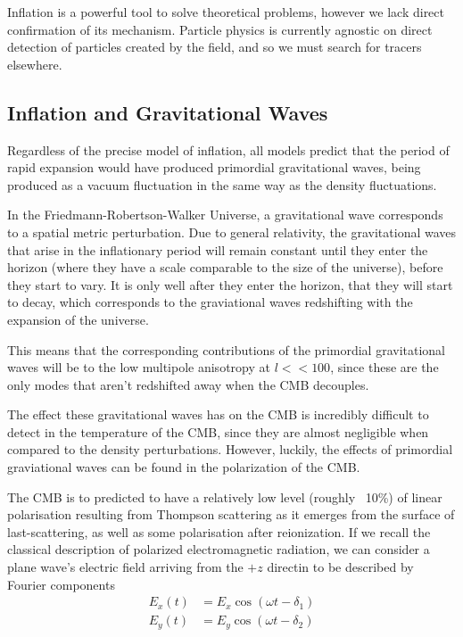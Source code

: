Inflation is a powerful tool to solve theoretical problems, however we lack direct confirmation of its mechanism. Particle physics is currently agnostic on direct detection of particles created by the field, and so we must search for tracers elsewhere. 

\subsection{Inflation and Gravitational Waves}
Regardless of the precise model of inflation, all models predict that the period of rapid expansion would have produced primordial gravitational waves, being produced as a vacuum fluctuation in the same way as the density fluctuations. 

\par In the Friedmann-Robertson-Walker Universe, a gravitational wave corresponds to a spatial metric perturbation. Due to general relativity, the gravitational waves that arise in the inflationary period will remain constant until they enter the horizon (where they have a scale comparable to the size of the universe), before they start to vary. It is only well after they enter the horizon, that they will start to decay, which corresponds to the graviational waves redshifting with the expansion of the universe. 

\par This means that the corresponding contributions of the primordial gravitational waves will be to the low multipole anisotropy at $l<<100$, since these are the only modes that aren't redshifted away when the CMB decouples. 

\par The effect these gravitational waves has on the CMB is incredibly difficult to detect in the temperature of the CMB, since they are almost negligible when compared to the density perturbations. However, luckily, the effects of primordial graviational waves can be found in the polarization of the CMB. 

\par The CMB is to predicted to have a relatively low level (roughly ~10\%) of linear polarisation resulting from Thompson scattering as it emerges from the surface of last-scattering, as well as some polarisation after reionization. If we recall the classical description of polarized electromagnetic radiation, we can consider a plane wave's electric field arriving from the $+z$ directin to be described by Fourier components
\begin{align*}
E_x (t) &= E_x \cos(\omega t - \delta_1) \\
E_y (t) &= E_y \cos(\omega t - \delta_2)
\end{align*} 

